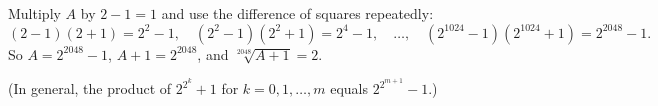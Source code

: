 Multiply $A$ by $2-1=1$ and use the difference of squares repeatedly:
\[(2-1)(2+1)=2^2-1,\quad\left(2^2-1\right)\left(2^2+1\right)=2^4-1,\quad\dots,\quad\left(2^{1024}-1\right)\left(2^{1024}+1\right)=2^{2048}-1.\]
So $A=2^{2048}-1$, $A+1=2^{2048}$, and $\sqrt[2048]{A+1}=\boxed{2}$.

(In general, the product of $2^{2^k}+1$ for $k=0,1,\dots,m$ equals $2^{2^{m+1}}-1$.)
